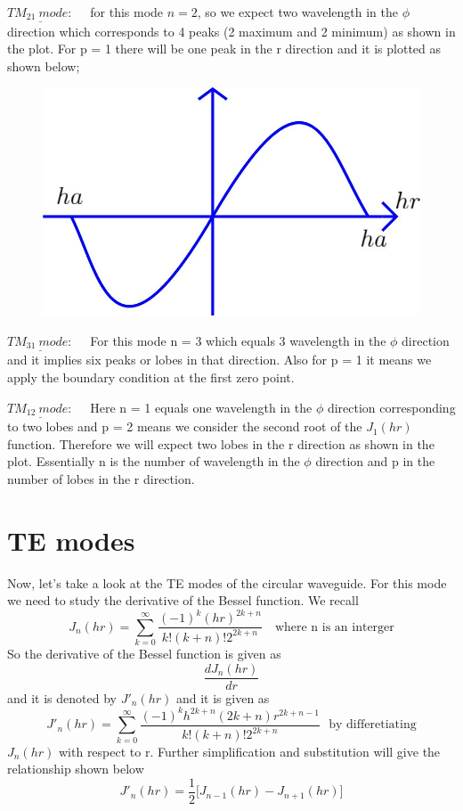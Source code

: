 $\underline{TM_{21} \ mode:}$ \ \ for this mode $n=2$, so we expect two wavelength in the $\phi$ direction which corresponds to 4 peaks (2 maximum and 2 minimum) as shown in the plot. For  p = 1 there will be one peak in the r direction and it is plotted as shown below;
\begin{figure}[H]
\centering
\includegraphics[width=1\linewidth]{./graphics/m4}
\caption{}
\label{fig:m4}
\end{figure}

$\underline{TM_{31} \ mode:}$ \  \ For this mode n = 3 which equals 3 wavelength in the $\phi$ direction and it implies six peaks or lobes in that direction. Also for p = 1  it means we apply the boundary condition at the first zero point.

$\underline{TM_{12} \ mode:}$ \  \ Here n = 1 equals one wavelength in the $\phi$ direction corresponding to two lobes and p = 2 means we consider the second root of the   $J_1(hr)$ function. Therefore we will expect two lobes in the r direction as shown in the plot. Essentially n is the number of wavelength in the $\phi$  direction and p in the number of lobes in the r direction.
      
\section{TE modes}
 Now, let's take a look at the TE modes of  the circular waveguide. For this mode we need to study the derivative of the Bessel function. We recall 
$$ J_n(hr) = \sum_{k = 0}^{\infty}\dfrac{(-1)^k(hr)^{2k + n}}{k!(k+n)!2^{2k + n}} \quad \text{where n is an interger}$$
So the derivative of the Bessel function is given as $$ \dfrac{dJ_n(hr)}{dr} $$ and it is denoted by $J'_n(hr) $ and it is given as 
$$J'_n(hr) = \sum_{k = 0}^{\infty}\dfrac{(-1)^k h^{2k + n}(2k + n)r^{2k + n -1}}{k!(k+n)!2^{2k + n}} \ \ \ \text{by differetiating}$$		
$J_n(hr)$ with respect to r. Further simplification and substitution will give the relationship shown below 
$$ J'_n(hr) = \frac{1}{2}\bigg[J_{n-1}(hr) - J_{n + 1}(hr)\bigg] $$


